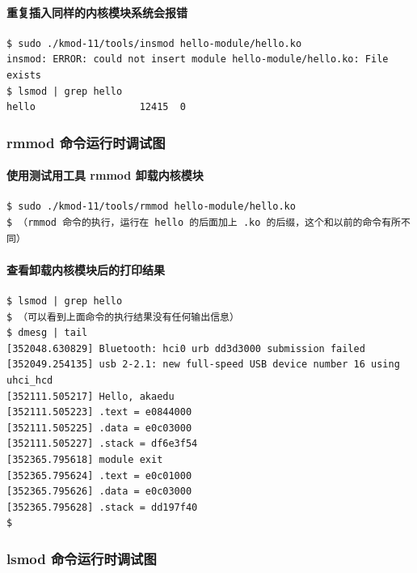 \documentclass[11pt,a4paper]{article}
\begin{document}
\paragraph{重复插入同样的内核模块系统会报错}

{\begin{shaded}\begin{verbatim}
$ sudo ./kmod-11/tools/insmod hello-module/hello.ko 
insmod: ERROR: could not insert module hello-module/hello.ko: File exists
$ lsmod | grep hello
hello                  12415  0 
\end{verbatim}\end{shaded}}
\subsubsection{rmmod 命令运行时调试图}

\paragraph{使用测试用工具 rmmod 卸载内核模块}

{\begin{shaded}\begin{verbatim}
$ sudo ./kmod-11/tools/rmmod hello-module/hello.ko
$ （rmmod 命令的执行，运行在 hello 的后面加上 .ko 的后缀，这个和以前的命令有所不同）
\end{verbatim}\end{shaded}}
\paragraph{查看卸载内核模块后的打印结果}

{\begin{shaded}\begin{verbatim}
$ lsmod | grep hello
$ （可以看到上面命令的执行结果没有任何输出信息）
$ dmesg | tail
[352048.630829] Bluetooth: hci0 urb dd3d3000 submission failed
[352049.254135] usb 2-2.1: new full-speed USB device number 16 using uhci_hcd
[352111.505217] Hello, akaedu
[352111.505223] .text = e0844000
[352111.505225] .data = e0c03000
[352111.505227] .stack = df6e3f54
[352365.795618] module exit
[352365.795624] .text = e0c01000
[352365.795626] .data = e0c03000
[352365.795628] .stack = dd197f40
$ 
\end{verbatim}\end{shaded}}
\subsubsection{lsmod 命令运行时调试图}
\end{document}
